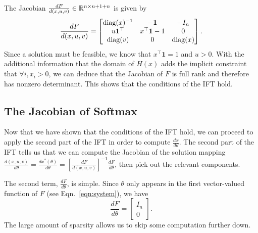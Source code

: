 \documentclass[11pt]{article}
\begin{document}
The Jacobian $\frac{dF}{d(x,u,v)}\in\mathbb{R}^{n\times n+1+n}$ is given by
\begin{equation}
\label{eqn:f-jac}
\frac{dF}{d(x,u,v)}=
\begin{bmatrix}
\mathrm{diag}(x)^{-1} & -\mathbf{1} & -I_n \\
u\mathbf{1}^\top & x^\top\mathbf{1} - 1 & 0\\
\mathrm{diag}(v) & 0 & \mathrm{diag}(x)
\end{bmatrix}.
\end{equation}
Since a solution must be feasible, we know that $x^\top\mathbf{1} = 1$ and $u > 0$.
With the additional information that the domain of $H(x)$
adds the implicit constraint that $\forall i, x_i > 0$,
we can deduce that the Jacobian of $F$ is full rank and therefore has nonzero determinant.
This shows that the conditions of the IFT hold.


\subsection{The Jacobian of Softmax}
Now that we have shown that the conditions of the IFT hold,
we can proceed to apply the second part of the IFT in order to compute $\frac{dx}{d\theta}$.
The second part of the IFT tells us that we can compute the Jacobian of the
solution mapping $\frac{d(x,u,v)}{d\theta} = \frac{dx^*(\theta)}{d\theta}
= \left[\frac{dF}{d(x,u,v)}\right]^{-1}\frac{dF}{d\theta}$,
then pick out the relevant components.

The second term, $\frac{dF}{d\theta}$, is simple.
Since $\theta$ only appears in the first vector-valued function of $F$
(see Eqn.~\ref{eqn:system}), we have
\begin{equation}
\label{eqn:df-dtheta}
\frac{dF}{d\theta} = \begin{bmatrix}
    I_n\\
    0
\end{bmatrix}.
\end{equation}
The large amount of sparsity allows us to skip some computation further down.
\end{document}
